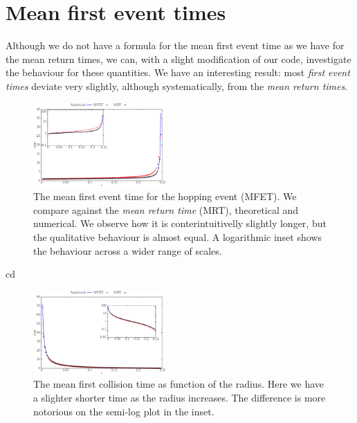 \documentclass[superscriptaddress,pre,reprint,showpacs,onecolumn]{revtex4-1}
\begin{document}

\section{Mean first event times}

Although we do not have a formula for the mean first event time as
we have for the mean return times, we can, with a slight modification
of our code, investigate the behaviour for these quantities. We have 
an interesting result: most \emph{first event times} deviate very slightly,
although systematically, from the \emph{mean return times}.



\begin{figure}[h]
  \centering
  \includegraphics[width=0.45\textwidth]{./FigurasPerfectas/FistHopTime01-ForPaper.pdf}
  \caption{The mean first event time for the hopping event (MFET).
    We compare against the \emph{mean return time} (MRT), theoretical
and numerical. We observe how it is conterintuitivelly slightly longer,
but the qualitative behaviour is almost equal. A logarithmic inset
shows the behaviour across a wider range of scales. }\label{FirstHopp01}
\end{figure}cd

\begin{figure}[h]
  \centering
  \includegraphics[width=0.45\textwidth]{./FigurasPerfectas/FistCollTime02-ForPaper.pdf}
  \caption{The mean first collision time as function of the radius.
    Here we have  a slighter shorter time as the radius increases. The difference
is more notorious on the semi-log plot in the inset. 
 }\label{FirstCol01}
\end{figure}
\end{document}
